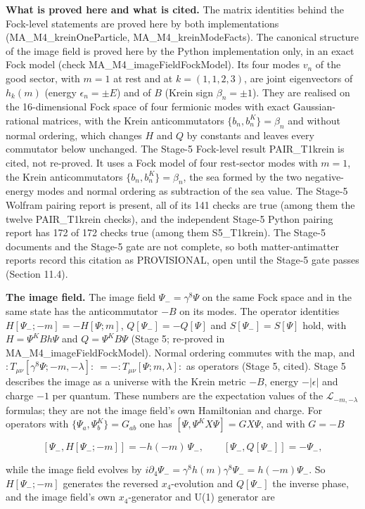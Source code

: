 \documentclass[11pt]{article}
\begin{document}
\textbf{What is proved here and what is cited.} The matrix identities behind the Fock-level statements are proved here by both implementations (MA\_M4\_kreinOneParticle, MA\_M4\_kreinModeFacts). The canonical structure of the image field is proved here by the Python implementation only, in an exact Fock model (check MA\_M4\_imageFieldFockModel). Its four modes $v_n$ of the good sector, with $m=1$ at rest and at $k=(1,1,2,3)$, are joint eigenvectors of $h_k(m)$ (energy $\epsilon_n=\pm E$) and of $B$ (Krein sign $\beta_n=\pm1$). They are realised on the 16-dimensional Fock space of four fermionic modes with exact Gaussian-rational matrices, with the Krein anticommutators $\{b_n,b_n^K\}=\beta_n$ and without normal ordering, which changes $H$ and $Q$ by constants and leaves every commutator below unchanged. The Stage-5 Fock-level result PAIR\_T1krein is cited, not re-proved. It uses a Fock model of four rest-sector modes with $m=1$, the Krein anticommutators $\{b_n,b_n^K\}=\beta_n$, the sea formed by the two negative-energy modes and normal ordering as subtraction of the sea value. The Stage-5 Wolfram pairing report is present, all of its 141 checks are true (among them the twelve PAIR\_T1krein checks), and the independent Stage-5 Python pairing report has 172 of 172 checks true (among them S5\_T1krein). The Stage-5 documents and the Stage-5 gate are not complete, so both matter-antimatter reports record this citation as PROVISIONAL, open until the Stage-5 gate passes (Section 11.4).

\textbf{The image field.} The image field $\Psi_-=\gamma^8\Psi$ on the same Fock space and in the same state has the anticommutator $-B$ on its modes. The operator identities $H[\Psi_-;-m]=-H[\Psi;m]$, $Q[\Psi_-]=-Q[\Psi]$ and $S[\Psi_-]=S[\Psi]$ hold, with $H=\Psi^KBh\Psi$ and $Q=\Psi^KB\Psi$ (Stage 5; re-proved in MA\_M4\_imageFieldFockModel). Normal ordering commutes with the map, and $:T_{\mu\nu}[\gamma^8\Psi;-m,-\lambda]:\ =-:T_{\mu\nu}[\Psi;m,\lambda]:$ as operators (Stage 5, cited). Stage 5 describes the image as a universe with the Krein metric $-B$, energy $-|\epsilon|$ and charge $-1$ per quantum. These numbers are the expectation values of the $\mathcal L_{-m,-\lambda}$ formulas; they are not the image field's own Hamiltonian and charge. For operators with $\{\Psi_a,\Psi^K_b\}=G_{ab}$ one has $[\Psi,\Psi^KX\Psi]=GX\Psi$, and with $G=-B$

\[
[\Psi_-,H[\Psi_-;-m]]=-h(-m)\,\Psi_-,\qquad [\Psi_-,Q[\Psi_-]]=-\Psi_-,
\]

while the image field evolves by $i\partial_4\Psi_-=\gamma^8h(m)\gamma^8\Psi_-=h(-m)\Psi_-$. So $H[\Psi_-;-m]$ generates the reversed $x_4$-evolution and $Q[\Psi_-]$ the inverse phase, and the image field's own $x_4$-generator and U(1) generator are
\end{document}
